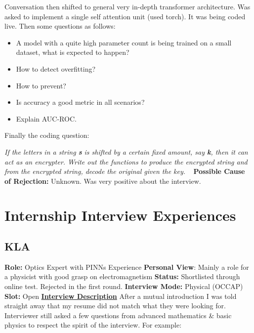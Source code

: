 \documentclass[12pt]{article}
\begin{document}
Conversation then shifted to general very in-depth transformer architecture. Was asked to implement a single self attention unit (used torch). It was being coded live.
\newline
Then some questions as follows:
 \begin{itemize}
    \item A model with a quite high parameter count is being trained on a small dataset, what is expected to happen?
    \item How to detect overfitting?
    \item How to prevent? 
    \item Is accuracy a good metric in all scenarios?
    \item Explain AUC-ROC.
 \end{itemize}

Finally the coding question:

\textit{If the letters in a string \textbf{s} is shifted by a certain fixed amount, say \textbf{k}, then it can act as an encrypter. Write out the functions to produce the encrypted string and from the encrypted string, decode the original given the key.}
\newline
\vspace{1pt}\
\newline
\textbf{Possible Cause of Rejection:} Unknown. Was very positive about the interview.


\section{Internship Interview Experiences}

\subsection{KLA}
\textbf{Role:} Optics Expert with PINNs Experience
\newline
\textbf{Personal View}: Mainly a role for a physicist with good grasp on electromagnetism
\newline
\textbf{Status:} Shortlisted through online test. Rejected in the first round.
\newline
\textbf{Interview Mode:} Physical (OCCAP)
\newline
\textbf{Slot:} Open
\vspace{10pt}
\newline
\underline{\textbf{Interview Description}}
\newline
After a mutual introduction I was told straight away that my resume did not match what they were looking for. Interviewer still asked a few questions from advanced mathematics \& basic physics to respect the spirit of the interview. For example:
\end{document}
